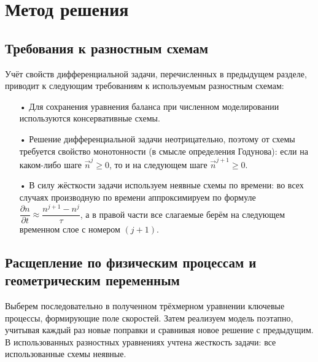 \documentclass[14pt, a4paper, fleqn]{extarticle}
\renewcommand{\geq}{\geqslant}
\begin{document}
\section{Метод решения}


\subsection{Требования к разностным схемам}

Учёт свойств дифференциальной задачи, перечисленных в предыдущем разделе, приводит к следующим требованиям к используемым разностным схемам: 

\begin{itemize}

\item[•] Для сохранения уравнения баланса при численном моделировании используются консервативные схемы.

\item[•] Решение дифференциальной задачи неотрицательно, поэтому от схемы требуется свойство монотонности (в смысле определения Годунова): если на каком-либо шаге $\vec{n}^j \geq 0$, то и на следующем шаге $\vec{n}^{j+1}\geq 0$. 

\item[•] В силу жёсткости задачи используем неявные схемы по времени: во всех случаях производную по времени аппроксимируем по формуле $\dfrac{\partial n}{\partial t}\approx \dfrac{n^{j+1}-n^j}{\tau}$, а в правой части все слагаемые берём на следующем временном слое с номером $(j+1)$.
\end{itemize}

\subsection{Расщепление по физическим процессам и геометрическим переменным}

Выберем последовательно в полученном трёхмерном уравнении ключевые процессы, формирующие поле скоростей. Затем реализуем модель поэтапно, учитывая каждый раз новые поправки и сравнивая новое решение с предыдущим. В использованных разностных уравнениях учтена жесткость задачи: все использованные схемы неявные. 
\end{document}
